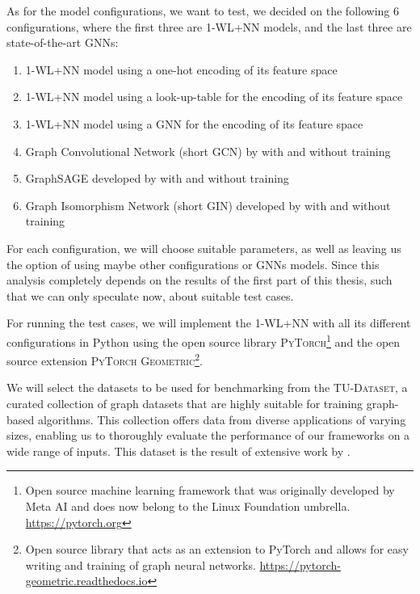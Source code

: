 \documentclass[11pt, dvipsnames, DIV=12]{scrreprt}
\theoremstyle{definition}
\begin{document}
As for the model configurations, we want to test, we decided on the following 6 configurations, where the first three are 1-WL+NN models, and the last three are state-of-the-art GNNs:
\begin{enumerate}
    \item 1-WL+NN model using a one-hot encoding of its feature space
    \item 1-WL+NN model using a look-up-table for the encoding of its feature space
    \item 1-WL+NN model using a GNN for the encoding of its feature space
    \item Graph Convolutional Network (short GCN) by \cite{Kip+2017} with and without training
    \item GraphSAGE developed by \cite{Ham+2017} with and without training
    \item Graph Isomorphism Network (short GIN) developed by \cite{Xu2018} with and without training
\end{enumerate}
For each configuration, we will choose suitable parameters, as well as leaving us the option of using maybe other configurations or GNNs models. Since this analysis completely depends on the results of the first part of this thesis, such that we can only speculate now, about suitable test cases.

For running the test cases, we will implement the 1-WL+NN with all its different configurations in Python using the open source library \textsc{PyTorch}\footnote{Open source machine learning framework that was originally developed by Meta AI and does now belong to the Linux Foundation umbrella. \href{https://pytorch.org}{https://pytorch.org}} and the open source extension \textsc{PyTorch Geometric}\footnote{Open source library that acts as an extension to PyTorch and allows for easy writing and training of graph neural networks. \href{https://pytorch-geometric.readthedocs.io/en/latest}{https://pytorch-geometric.readthedocs.io}}.

We will select the datasets to be used for benchmarking from the \textsc{TU-Dataset}, a curated collection of graph datasets that are highly suitable for training graph-based algorithms. This collection offers data from diverse applications of varying sizes, enabling us to thoroughly evaluate the performance of our frameworks on a wide range of inputs. This dataset is the result of extensive work by \cite{Mor+2020}.


\end{document}
